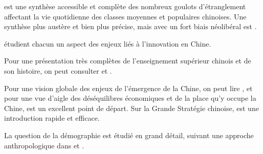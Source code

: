 \documentclass[a4paper]{article}
\begin{document}
\cite{damien14_in} est une synthèse accessible et complète des nombreux goulots d’étran\-gle\-ment affectant la vie quotidienne des classes moyennes et populaires chinoises. Une synthèse plus austère et bien plus précise, mais avec un fort biais néolibéral est \cite{dollar20_china}.

\cite{xiaolan15_chinas,haour16_creat_china,hong17_networ_china} étudient chacun un aspect des enjeux liés à l’innovation en Chine.

Pour une présentation très complètes de l’enseignement supérieur chinois et de son histoire, on peut consulter \cite{andreas09_rise} et \cite{simon09_chinas}.

Pour une vision globale des enjeux de l’émergence de la Chine, on peut lire \cite{shambaugh13_china}, et pour une vue d’aigle des déséquilibres économiques et de la place qu’y occupe la Chine, \cite{klein20_trade} est un excellent point de départ. Sur la Grande Stratégie chinoise, \cite{khan18_haunt} est une introduction rapide et efficace.

La question de la démographie est étudié en grand détail, suivant une approche anthropologique dans \cite{greenhalgh08_just,greenhalgh05_gover_chinas} et \cite{greenhalgh10_cultiv}.



\end{document}
